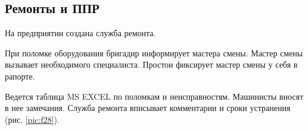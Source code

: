 \subsection{Ремонты и ППР}
\label{bp:maintance}


На предприятии создана служба ремонта. 

При поломке оборудования бригадир информирует мастера смены. Мастер смены вызывает необходимого специалиста. Простои фиксирует мастер смены у себя в рапорте. 

Ведется таблица MS EXCEL по поломкам и неисправностям. Машинисты вносят в нее замечания. Служба ремонта вписывает комментарии и сроки устранения (рис. \ref{pic:f28}).




